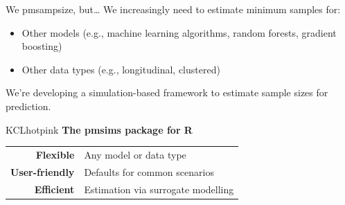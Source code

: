 \documentclass[11pt]{beamer}
\newcommand*{\colitem}[2]{%
	\item[\textcolor{#1}{\textbullet}] \textcolor{#1}{#2}
}
\newcommand{\sgap}{\vspace{0.5em}}
\newcommand{\bgap}{\vspace{0.8em}}
\newcommand*{\img}[1]{%
	\raisebox{-.3\baselineskip}{%
		\texttt{[image: \#1]}%
	}%
}
\begin{document}
\begin{frame}[t]{We \img{figures/heart.png} pmsampsize, but\ldots}
	\large
	\vspace{1em}
	We increasingly need to estimate minimum samples for:\ \sgap
	\begin{itemize}
		\colitem{KCLpurple}{Other models (e.g., machine learning algorithms, random
			forests, gradient boosting)}
		\colitem{KCLseablue}{Other data types (e.g., longitudinal, clustered)}
	\end{itemize}

	\vspace{1.5em}
	We're developing a simulation-based framework to estimate sample
	sizes for prediction.

	\begin{cbox}[colframe=KCLhotpink!50!black]{KCLhotpink}{}
		\RaggedRight
		{\Large \textbf{The pmsims package for R}}

		\bgap

		\begin{tabular}{rp{}}
			\textbf{Flexible}      & Any model or data type             \\
			\textbf{User-friendly} & Defaults for common scenarios      \\
			\textbf{Efficient}     & Estimation via surrogate modelling
		\end{tabular}
	\end{cbox}

\end{frame}
\end{document}
